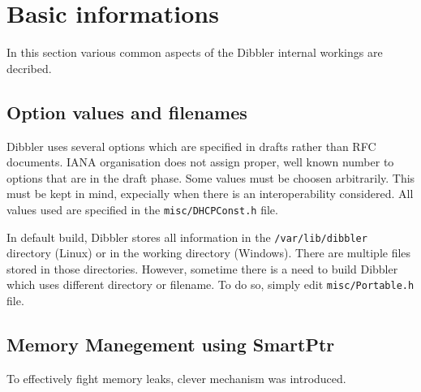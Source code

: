 
\section{Basic informations}

In this section various common aspects of the Dibbler internal
workings are decribed.

\subsection{Option values and filenames}

Dibbler uses several options which are specified in drafts rather than
RFC documents. IANA organisation does not assign proper, well known
number to options that are in the draft phase. Some values must be
choosen arbitrarily. This must be kept in mind, expecially when there
is an interoperability considered. All values used are specified in the
\verb+misc/DHCPConst.h+ file. 

In default build, Dibbler stores all information in the
\verb+/var/lib/dibbler+ directory (Linux) or in the working directory
(Windows). There are multiple files stored in those
directories. However, sometime there is a need to build Dibbler which uses
different directory or filename. To do so, simply edit
\verb+misc/Portable.h+ file.

\subsection{Memory Manegement using SmartPtr}
To effectively fight memory leaks, clever mechanism was introduced. 


